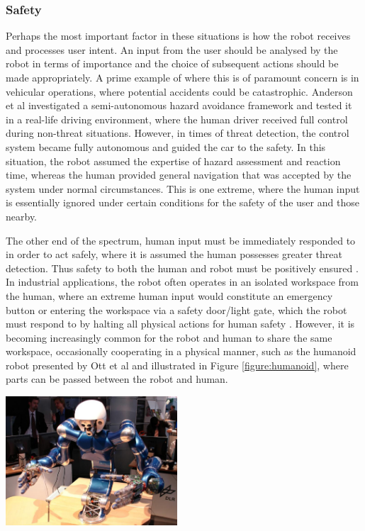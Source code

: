 \documentclass[11pt]{article}
\begin{document}
\subsubsection{Safety}

Perhaps the most important factor in these situations is how the robot receives and processes user intent. An input from the user should be analysed by the robot in terms of importance and the choice of subsequent actions should be made appropriately. A prime example of where this is of paramount concern is in vehicular operations, where potential accidents could be catastrophic. Anderson et al \cite{Anderson2010} investigated a semi-autonomous hazard avoidance framework and tested it in a real-life driving environment, where the human driver received full control during non-threat situations. However, in times of threat detection, the control system became fully autonomous and guided the car to the safety. In this situation, the robot assumed the expertise of hazard assessment and reaction time, whereas the human provided general navigation that was accepted by the system under normal circumstances. This is one extreme, where the human input is essentially ignored under certain conditions for the safety of the user and those nearby. 

The other end of the spectrum, human input must be immediately responded to in order to act safely, where it is assumed the human possesses greater threat detection. Thus safety to both the human and robot must be positively ensured \cite{Haddadin2007}. In industrial applications, the robot often operates in an isolated workspace from the human, where an extreme human input would constitute an emergency button or entering the workspace via a safety door/light gate, which the robot must respond to by halting all physical actions for human safety \cite{ISOGuards}. However, it is becoming increasingly common for the robot and human to share the same workspace, occasionally cooperating in a physical manner, such as the humanoid robot presented by Ott et al \cite{Ott2006} and illustrated in Figure \ref{figure:humanoid}, where parts can be passed between the robot and human.

\begin{center}
\includegraphics[width=0.48\textwidth]{humanoid.png}
\label{figure:humanoid}
\end{center}
\end{document}
